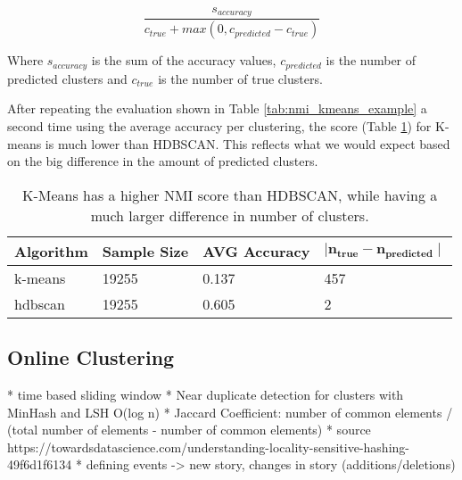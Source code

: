 \begin{equation}
    \label{equ:avg_accuracy}
        \frac{s_{accuracy}}{c_{true} + max(0, c_{predicted} - c_{true})}
\end{equation}

Where $s_{accuracy}$ is the sum of the accuracy values, $c_{predicted}$ is the number of predicted clusters and $c_{true}$ is the number of true clusters.


After repeating the evaluation shown in Table \ref{tab:nmi_kmeans_example} a second time using the average accuracy per clustering, the score (Table \ref{tab:avg_predict_kmeans_example}) for K-means is much lower than HDBSCAN. This reflects what we would expect based on the big difference in the amount of predicted clusters.

\begin{table}[h]
    \centering
    \begin{tabular}{|l|l|l|l|}
    \hline
    \textbf{Algorithm} & \textbf{Sample Size} & \textbf{AVG Accuracy}  & $\mathbf{ \mid n_{true} - n_{predicted} \mid }$ \\ \hline
    k-means & 19255 & 0.137 & 457 \\ \hline
    hdbscan & 19255 & 0.605 & 2 \\ \hline
    \end{tabular}
    \caption{K-Means has a higher NMI score than HDBSCAN, while having a much larger difference in number of clusters.}
    \label{tab:avg_predict_kmeans_example}
\end{table}

\subsection{Online Clustering}

* time based sliding window
* Near duplicate detection for clusters with MinHash and LSH O(log n)
* Jaccard Coefficient: number of common elements / (total number of elements - number of common elements)
* source https://towardsdatascience.com/understanding-locality-sensitive-hashing-49f6d1f6134
* defining events -> new story, changes in story (additions/deletions)
